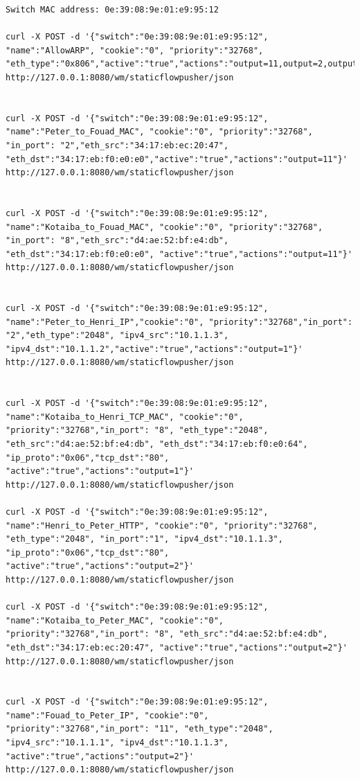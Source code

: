 \documentclass[a4paper]{article}
\begin{document}
\begin{verbatim}
Switch MAC address: 0e:39:08:9e:01:e9:95:12

curl -X POST -d '{"switch":"0e:39:08:9e:01:e9:95:12", "name":"AllowARP", "cookie":"0", "priority":"32768", "eth_type":"0x806","active":"true","actions":"output=11,output=2,output=1,output=8"}' http://127.0.0.1:8080/wm/staticflowpusher/json


curl -X POST -d '{"switch":"0e:39:08:9e:01:e9:95:12", "name":"Peter_to_Fouad_MAC", "cookie":"0", "priority":"32768", "in_port": "2","eth_src":"34:17:eb:ec:20:47", "eth_dst":"34:17:eb:f0:e0:e0","active":"true","actions":"output=11"}' http://127.0.0.1:8080/wm/staticflowpusher/json


curl -X POST -d '{"switch":"0e:39:08:9e:01:e9:95:12", "name":"Kotaiba_to_Fouad_MAC", "cookie":"0", "priority":"32768", "in_port": "8","eth_src":"d4:ae:52:bf:e4:db", "eth_dst":"34:17:eb:f0:e0:e0", "active":"true","actions":"output=11"}' http://127.0.0.1:8080/wm/staticflowpusher/json


curl -X POST -d '{"switch":"0e:39:08:9e:01:e9:95:12", "name":"Peter_to_Henri_IP","cookie":"0", "priority":"32768","in_port": "2","eth_type":"2048", "ipv4_src":"10.1.1.3", "ipv4_dst":"10.1.1.2","active":"true","actions":"output=1"}' http://127.0.0.1:8080/wm/staticflowpusher/json


curl -X POST -d '{"switch":"0e:39:08:9e:01:e9:95:12", "name":"Kotaiba_to_Henri_TCP_MAC", "cookie":"0", "priority":"32768","in_port": "8", "eth_type":"2048", "eth_src":"d4:ae:52:bf:e4:db", "eth_dst":"34:17:eb:f0:e0:64", "ip_proto":"0x06","tcp_dst":"80", "active":"true","actions":"output=1"}' http://127.0.0.1:8080/wm/staticflowpusher/json

curl -X POST -d '{"switch":"0e:39:08:9e:01:e9:95:12", "name":"Henri_to_Peter_HTTP", "cookie":"0", "priority":"32768", "eth_type":"2048", "in_port":"1", "ipv4_dst":"10.1.1.3", "ip_proto":"0x06","tcp_dst":"80", "active":"true","actions":"output=2"}' http://127.0.0.1:8080/wm/staticflowpusher/json

curl -X POST -d '{"switch":"0e:39:08:9e:01:e9:95:12", "name":"Kotaiba_to_Peter_MAC", "cookie":"0", "priority":"32768","in_port": "8", "eth_src":"d4:ae:52:bf:e4:db", "eth_dst":"34:17:eb:ec:20:47", "active":"true","actions":"output=2"}' http://127.0.0.1:8080/wm/staticflowpusher/json


curl -X POST -d '{"switch":"0e:39:08:9e:01:e9:95:12", "name":"Fouad_to_Peter_IP", "cookie":"0", "priority":"32768","in_port": "11", "eth_type":"2048", "ipv4_src":"10.1.1.1", "ipv4_dst":"10.1.1.3", "active":"true","actions":"output=2"}' http://127.0.0.1:8080/wm/staticflowpusher/json



\end{verbatim}
\end{document}
